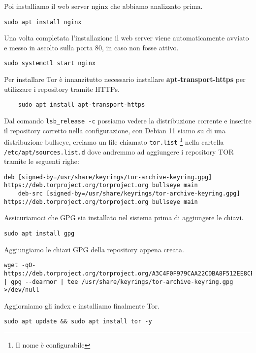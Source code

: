 Poi installiamo il web server nginx che abbiamo analizzato prima.
\begin{lstlisting}[caption={Installazione Nginx}]
    sudo apt install nginx
\end{lstlisting}

Una volta completata l'installazione il web server viene automaticamente avviato e messo in ascolto sulla porta 80, in caso non fosse attivo. \\
\begin{lstlisting}[caption={Avvio di Nginx}]
    sudo systemctl start nginx
\end{lstlisting}

Per installare Tor è innanzitutto necessario installare \textbf{apt-transport-https} per utilizzare i repository tramite HTTPs.
\begin{lstlisting}
    sudo apt install apt-transport-https
\end{lstlisting}
Dal comando \lstinline{lsb_release -c} possiamo vedere la distribuzione corrente e inserire il repository corretto nella configurazione, con Debian 11 siamo su di una distribuzione bullseye, creiamo un file chiamato \lstinline{tor.list} \footnote{Il nome è configurabile} nella cartella \lstinline{/etc/apt/sources.list.d} dove andremmo ad aggiungere i repository TOR tramite le seguenti righe:
\begin{lstlisting}[caption={Tor Repository}]
    deb [signed-by=/usr/share/keyrings/tor-archive-keyring.gpg] https://deb.torproject.org/torproject.org bullseye main
    deb-src [signed-by=/usr/share/keyrings/tor-archive-keyring.gpg] https://deb.torproject.org/torproject.org bullseye main
\end{lstlisting}

Assicuriamoci che GPG sia installato nel sistema prima di aggiungere le chiavi.
\begin{lstlisting}[caption={Installazione GPG}]
    sudo apt install gpg
\end{lstlisting}

Aggiungiamo le chiavi GPG della repository appena creata.
\begin{lstlisting}[caption={Aggiunta chiavi gpg dal repository Tor}]
    wget -qO- https://deb.torproject.org/torproject.org/A3C4F0F979CAA22CDBA8F512EE8CBC9E886DDD89.asc | gpg --dearmor | tee /usr/share/keyrings/tor-archive-keyring.gpg >/dev/null
\end{lstlisting}

Aggiorniamo gli index e installiamo finalmente Tor.
\begin{lstlisting}[caption={Installazione Tor}]
    sudo apt update && sudo apt install tor -y 
\end{lstlisting}

